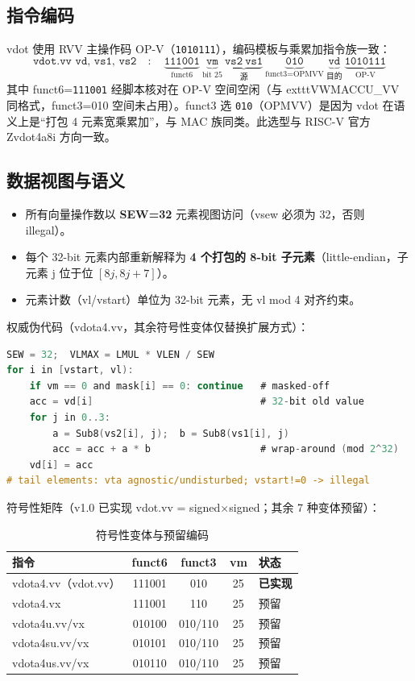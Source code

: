 \documentclass[11pt]{article}
\begin{document}
\subsection{指令编码}
vdot 使用 RVV 主操作码 OP-V（\texttt{1010111}），编码模板与乘累加指令族一致：
\begin{equation}
\texttt{vdot.vv vd, vs1, vs2} \quad:\quad
\underbrace{\texttt{111001}}_{\text{funct6}}
\ \underbrace{\texttt{vm}}_{\text{bit 25}}
\ \underbrace{\texttt{vs2} \ \texttt{vs1}}_{\text{源}}
\ \underbrace{\texttt{010}}_{\text{funct3=OPMVV}}
\ \underbrace{\texttt{vd}}_{\text{目的}}
\ \underbrace{\texttt{1010111}}_{\text{OP-V}}
\end{equation}
其中 funct6=\texttt{111001} 经脚本核对在 OP-V 空间空闲（与 	exttt{VWMACCU\_VV} 同格式，funct3=010 空间未占用）。funct3 选 \texttt{010}（OPMVV）是因为 vdot 在语义上是“打包 4 元素宽乘累加”，与 MAC 族同类。此选型与 RISC-V 官方 Zvdot4a8i 方向一致。

\subsection{数据视图与语义}
\begin{itemize}
  \item 所有向量操作数以 \textbf{SEW=32} 元素视图访问（vsew 必须为 32，否则 illegal）。
  \item 每个 32-bit 元素内部重新解释为 \textbf{4 个打包的 8-bit 子元素}（little-endian，子元素 j 位于位 $[8j,8j+7]$）。
  \item 元素计数（vl/vstart）单位为 32-bit 元素，无 vl mod 4 对齐约束。
\end{itemize}

权威伪代码（vdota4.vv，其余符号性变体仅替换扩展方式）：
\begin{lstlisting}[language=C]
SEW = 32;  VLMAX = LMUL * VLEN / SEW
for i in [vstart, vl):
    if vm == 0 and mask[i] == 0: continue   # masked-off
    acc = vd[i]                             # 32-bit old value
    for j in 0..3:
        a = Sub8(vs2[i], j);  b = Sub8(vs1[i], j)
        acc = acc + a * b                   # wrap-around (mod 2^32)
    vd[i] = acc
# tail elements: vta agnostic/undisturbed; vstart!=0 -> illegal
\end{lstlisting}

符号性矩阵（v1.0 已实现 vdot.vv = signed$\times$signed；其余 7 种变体预留）：
\begin{table}[htbp]
\centering
\caption{符号性变体与预留编码}
\label{tab:signed}
\begin{tabular}{l c c c l}
\toprule
\textbf{指令} & \textbf{funct6} & \textbf{funct3} & \textbf{vm} & \textbf{状态} \\
\midrule
vdota4.vv（vdot.vv） & 111001 & 010 & 25 & \textcolor{GreenOK}{\textbf{已实现}} \\
vdota4.vx & 111001 & 110 & 25 & 预留 \\
vdota4u.vv/vx & 010100 & 010/110 & 25 & 预留 \\
vdota4su.vv/vx & 010101 & 010/110 & 25 & 预留 \\
vdota4us.vv/vx & 010110 & 010/110 & 25 & 预留 \\
\bottomrule
\end{tabular}
\end{table}
\end{document}
